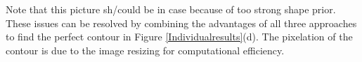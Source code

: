\documentclass{article} %
\begin{document}
Note that this picture sh/could be in case because of too strong shape prior.
These issues can be resolved by combining the advantages of  all three approaches to find the perfect contour in Figure \ref{Individualresults}(d). The pixelation of the contour is due to the image resizing for computational efficiency.

 \begin{figure}[htbp]
  \centering
\end{figure}
\end{document}

